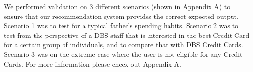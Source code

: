 We performed validation on 3 different scenarios (shown in Appendix A) to ensure that our recommendation system provides the correct expected output. Scenario 1 was to test for a typical father's spending habits. Scenario 2 was to test from the perspective of a DBS staff that is interested in the best Credit Card for a certain group of individuals, and to compare that with DBS Credit Cards. Scenario 3 was on the extreme case where the user is not eligible for any Credit Cards. For more information please check out Appendix A.